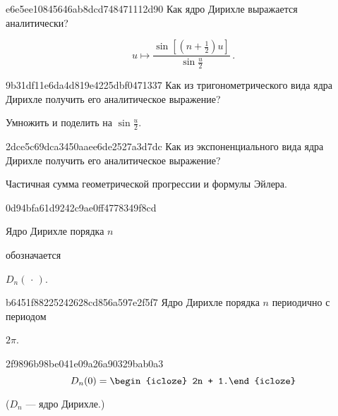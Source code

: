 \begin{note}{e6e5ee10845646ab8dcd748471112d90}
    Как ядро Дирихле выражается аналитически?

    \begin{cloze}{1}
        \[
            u \mapsto \frac{\sin \left[ (n+\frac{1}{2})u \right]}{\sin \frac{u}{2}}\,.
        \]
    \end{cloze}
\end{note}

\begin{note}{9b31df11e6da4d819e4225dbf0471337}
    Как из тригонометрического вида ядра Дирихле получить его аналитическое выражение?

    \begin{cloze}{1}
        Умножить и поделить на \({ \sin \frac{u}{2} }\).
    \end{cloze}
\end{note}

\begin{note}{2dce5c69dca3450aaee6de2527a3d7dc}
    Как из экспоненциального вида ядра Дирихле получить его аналитическое выражение?

    \begin{cloze}{1}
        Частичная сумма геометрической прогрессии и формулы Эйлера.
    \end{cloze}
\end{note}

\begin{note}{0d94bfa61d9242c9ae0ff4778349f8cd}
    \begin{icloze}{2}Ядро Дирихле порядка \({ n }\)\end{icloze} обозначается \begin{icloze}{1}\({ D_n (\,\cdot\,) }\).\end{icloze}
\end{note}

\begin{note}{b6451f88225242628cd856a597e2f5f7}
    Ядро Дирихле порядка \({ n }\) периодично с периодом \begin{icloze}{1}\({ 2\pi }\).\end{icloze}
\end{note}

\begin{note}{2f9896b98be041e09a26a90329bab0a3}
    \[
        D_n(0) = \begin{icloze}{1}2n + 1.\end{icloze}
    \]

    \begin{center}
        \tiny
        (\({ D_n }\) --- ядро Дирихле.)
    \end{center}
\end{note}

